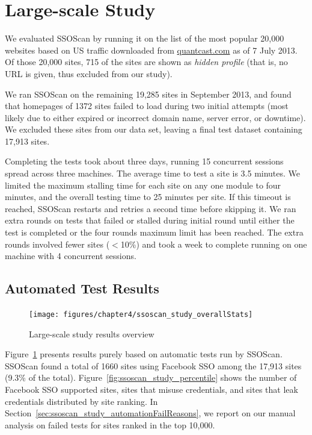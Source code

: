\section{Large-scale Study}
\label{sec:ssoscan_study}

We evaluated SSOScan by running it on the list of the most popular 20,000 websites based on US traffic downloaded from \url{quantcast.com} as of 7 July 2013.  Of those 20,000 sites, 715 of the sites are shown as \emph{hidden profile} (that is, no URL is given, thus excluded from our study).  

We ran SSOScan on the remaining 19,285 sites in September 2013, and found that homepages of 1372 sites failed to load during two initial attempts (most likely due to either expired or incorrect domain name, server error, or downtime).  We excluded these sites from our data set, leaving a final test dataset containing 17,913 sites.

Completing the tests took about three days, running 15 concurrent sessions spread across three machines.  The average time to test a site is 3.5 minutes.  We limited the maximum stalling time for each site on any one module to four minutes, and the overall testing time to 25 minutes per site.  If this timeout is reached, SSOScan restarts and retries a second time before skipping it.  We ran extra rounds on tests that failed or stalled during initial round until either the test is completed or the four rounds maximum limit has been reached.  The extra rounds involved fewer sites ($<$10\%) and took a week to complete running on one machine with 4 concurrent sessions.

\subsection{Automated Test Results}
\label{sec:ssoscan_study_generalstats}

\begin{figure}[hbt]
\centering
\texttt{[image: figures/chapter4/ssoscan\_study\_overallStats]}
\caption{Large-scale study results overview}
\label{fig:ssoscan_study_overallStats}
\end{figure}

Figure~\ref{fig:ssoscan_study_overallStats} presents results purely based on automatic tests run by SSOScan.  SSOScan found a total of 1660 sites using Facebook SSO among the 17,913 sites (9.3\% of the total).  Figure~\ref{fig:ssoscan_study_percentile} shows the number of Facebook SSO supported sites, sites that misuse credentials, and sites that leak credentials distributed by site ranking.  In Section~\ref{sec:ssoscan_study_automationFailReasons}, we report on our manual analysis on failed tests for sites ranked in the top 10,000.

